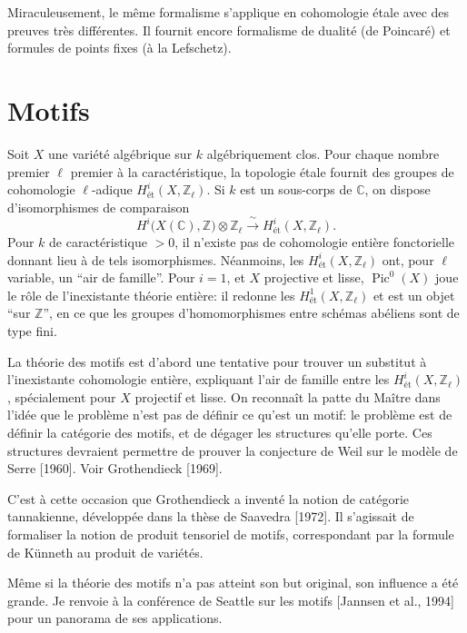 \documentclass[11pt,a4paper]{article}
\theoremstyle{plain}
\theoremstyle{definition}
\DeclareMathOperator{\Pic}{Pic}
\begin{document}
Miraculeusement, le m\^eme formalisme s'applique en cohomologie \'etale avec des preuves tr\`es diff\'erentes. Il fournit encore formalisme de dualit\'e (de Poincar\'e) et formules de points fixes (\`a la Lefschetz).

\section{Motifs}

Soit $X$ une vari\'et\'e alg\'ebrique sur $k$ alg\'ebriquement clos. Pour chaque nombre premier $\ell$ premier \`a la caract\'eristique, la topologie \'etale fournit des groupes de cohomologie $\ell$-adique $H^i_{\text{\'et}}(X, \mathbb{Z}_\ell)$. Si $k$ est un sous-corps de $\mathbb{C}$, on dispose d'isomorphismes de comparaison
\[
H^i\bigl(X(\mathbb{C}), \mathbb{Z}\bigr) \otimes \mathbb{Z}_\ell \xrightarrow{\;\sim\;} H^i_{\text{\'et}}(X, \mathbb{Z}_\ell).
\]
Pour $k$ de caract\'eristique $> 0$, il n'existe pas de cohomologie enti\`ere fonctorielle donnant lieu \`a de tels isomorphismes. N\'eanmoins, les $H^i_{\text{\'et}}(X, \mathbb{Z}_\ell)$ ont, pour $\ell$ variable, un ``air de famille''. Pour $i=1$, et $X$ projective et lisse, $\Pic^0(X)$ joue le r\^ole de l'inexistante th\'eorie enti\`ere: il redonne les $H^1_{\text{\'et}}(X, \mathbb{Z}_\ell)$ et est un objet ``sur $\mathbb{Z}$'', en ce que les groupes d'homomorphismes entre sch\'emas ab\'eliens sont de type fini.

La th\'eorie des motifs est d'abord une tentative pour trouver un substitut \`a l'inexistante cohomologie enti\`ere, expliquant l'air de famille entre les $H^i_{\text{\'et}}(X, \mathbb{Z}_\ell)$, sp\'ecialement pour $X$ projectif et lisse. On reconna\^it la patte du Ma\^itre dans l'id\'ee que le probl\`eme n'est pas de d\'efinir ce qu'est un motif: le probl\`eme est de d\'efinir la cat\'egorie des motifs, et de d\'egager les structures qu'elle porte. Ces structures devraient permettre de prouver la conjecture de Weil sur le mod\`ele de Serre [1960]. Voir Grothendieck [1969].

C'est \`a cette occasion que Grothendieck a invent\'e la notion de cat\'egorie tannakienne, d\'evelopp\'ee dans la th\`ese de Saavedra [1972]. Il s'agissait de formaliser la notion de produit tensoriel de motifs, correspondant par la formule de K\"unneth au produit de vari\'et\'es.

M\^eme si la th\'eorie des motifs n'a pas atteint son but original, son influence a \'et\'e grande. Je renvoie \`a la conf\'erence de Seattle sur les motifs [Jannsen et al., 1994] pour un panorama de ses applications.
\end{document}
